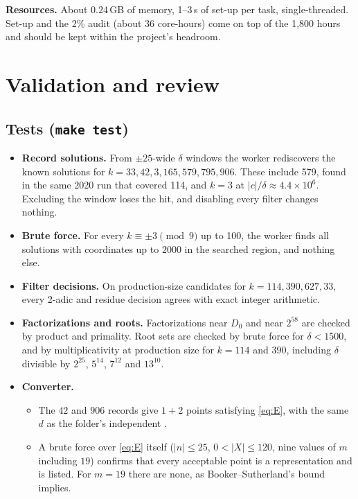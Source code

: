 \documentclass[11pt,a4paper]{article}
\theoremstyle{remark}
\newcommand{\code}[1]{\path{#1}}
\begin{document}
\endgroup
\noindent\textbf{Resources.} About $0.24$\,GB of memory, 1--3\,s of set-up per task,
single-threaded. Set-up and the 2\% audit (about 36 core-hours) come on top of the 1{,}800
hours and should be kept within the project's headroom.

\section{Validation and review}\label{sec:validation}

\subsection{Tests (\texttt{make test})}
\begin{itemize}[leftmargin=*]
\item \textbf{Record solutions.} From $\pm25$-wide $\delta$ windows the worker rediscovers the
known solutions for $k=33,42,3,165,579,795,906$. These include 579, found in the same 2020
run that covered 114, and $k=3$ at $|c|/\delta\approx4.4\times10^6$. Excluding the window
loses the hit, and disabling every filter changes nothing.
\item \textbf{Brute force.} For every $k\equiv\pm3\pmod9$ up to 100, the worker finds all
solutions with coordinates up to $2000$ in the searched region, and nothing else.
\item \textbf{Filter decisions.} On production-size candidates for $k=114,390,627,33$, every
2-adic and residue decision agrees with exact integer arithmetic.
\item \textbf{Factorizations and roots.} Factorizations near $D_0$ and near $2^{58}$ are
checked by product and primality. Root sets are checked by brute force for $\delta<1500$,
and by multiplicativity at production size for $k=114$ and $390$, including $\delta$
divisible by $2^{25}$, $5^{14}$, $7^{12}$ and $13^{10}$.
\item \textbf{Converter.}
  \begin{itemize}
    \item The $42$ and $906$ records give $1+2$ points satisfying \eqref{eq:E}, with the same
    $d$ as the folder's independent \code{grid/verify.py}.
    \item A brute force over \eqref{eq:E} itself ($|n|\le25$, $0<|X|\le120$, nine values of
    $m$ including $19$) confirms that every acceptable point is a representation and is
    listed. For $m=19$ there are none, as Booker--Sutherland's bound implies.

\end{itemize}
\end{itemize}
\end{document}
